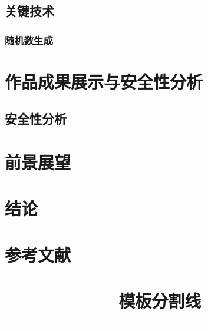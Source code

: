 \documentclass[zihao=-4]{ctexart}
\begin{document}
\subsection{关键技术}
\subsubsection{随机数生成}

\section{作品成果展示与安全性分析}
\subsection{安全性分析}

\section{前景展望}

\section{结论}

\section{参考文献}



\section{——————模板分割线——————}
\end{document}
